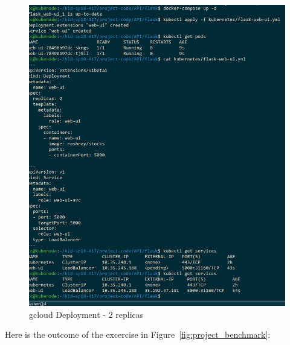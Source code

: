 \begin{figure}[htb]
	\centering\includegraphics[width=\columnwidth]{images/hid_417_gcloud_2replicas_console_benchmark.png}
  \caption{gcloud Deployment - 2 replicas}
  \label{fig:project_deployment}
\end{figure}

Here is the outcome of the excercise in Figure~\ref{fig:project_benchmark}:

